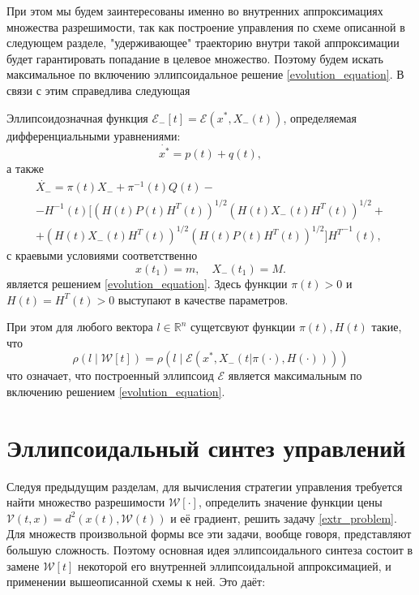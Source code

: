 При этом мы будем заинтересованы именно во внутренних аппроксимациях множества разрешимости, так как
 построение управления по схеме описанной в следующем разделе, "удерживающее" траекторию внутри такой
 аппроксимации будет гарантировать попадание в целевое множество. Поэтому будем искать максимальное 
 по включению эллипсоидальное решение \eqref{evolution_equation}. В связи с этим справедлива следующая

\begin{theorem}
    Эллипсоидозначная функция \( \mathcal{E}_-[t] = \mathcal{E}(x^*, X_-(t)) \), определяемая
     дифференциальными уравнениями:
    \begin{equation}\label{dif_center}
        \dot{x^*} = p(t) + q(t),
    \end{equation}
    а также
    \begin{equation}\label{dif_matrix}
        \begin{gathered}
            \dot{X_-} = \pi(t) X_- + \pi^{-1}(t) Q(t) - \\
             - H^{-1}(t) [(H(t) P(t) H^T(t))^{1/2} (H(t) X_-(t) H^T(t))^{1/2} + \\
             + (H(t) X_-(t) H^T(t))^{1/2}(H(t) P(t) H^T(t))^{1/2}] {H^T}^{-1}(t),
        \end{gathered}
    \end{equation}
    с краевыми условиями соответственно
    \begin{equation*}\label{dif_boundary}
        x(t_1) = m, \quad X_-(t_1) = M.
    \end{equation*}
    является решением \eqref{evolution_equation}. Здесь функции \( \pi(t) > 0 \) и \( H(t) = H^T(t) > 0 \)
     выступают в качестве параметров.
    
    При этом для любого вектора \( l \in \mathbb{R}^n \) сущетсвуют функции \( \pi(t), H(t) \) такие,
     что
    \begin{equation}
        \rho(l \mid \mathcal{W}[t]) = \rho(l \mid \mathcal{E}(x^*, X_-(t | \pi(\cdot), H(\cdot))))
    \end{equation}
    что означает, что построенный эллипсоид \( \mathcal{E} \) является максимальным по включению
     решением \eqref{evolution_equation}. 
\end{theorem}

\section{Эллипсоидальный синтез управлений}
Следуя предыдущим разделам, для вычисления стратегии управления требуется найти множество разрешимости
 \( \mathcal{W}[\cdot] \), определить значение функции цены \( \mathcal{V}(t,x) = d^2(x(t),
 \mathcal{W}(t)) \) и её градиент, решить задачу \eqref{extr_problem}. Для множеств произвольной формы
 все эти задачи, вообще говоря, представляют большую сложность. Поэтому основная идея эллипсоидального
 синтеза состоит в замене \( \mathcal{W}[t] \) некоторой его внутренней эллипсоидальной аппроксимацией,
 и применении вышеописанной схемы к ней. Это даёт:

